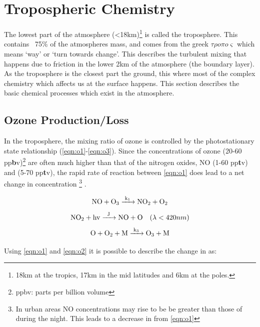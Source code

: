 \citep{failparis}



\section{Tropospheric Chemistry}

The lowest part of the atmosphere (<18km)\footnote{18km at the tropics, 17km in the mid latitudes and 6km at the poles. } is called the troposphere. This contains ~75\% of the atmospheres mass, and comes from the greek $\tau\rho o \pi o \varsigma$ which means `way' or `turn towards change'. This describes the turbulent mixing that happens due to friction in the lower 2km of the atmosphere (the boundary layer). As the troposphere is the closest part the ground, this where most of the complex chemistry which affects us at the surface happens. This section describes the basic chemical processes which exist in the atmosphere.




\subsection{Ozone Production/Loss}\label{sec:o3prod}
In the troposphere, the mixing ratio of ozone is controlled by the photostationary state relationship (\autoref{eqn:o1}-\ref{eqn:o3}).
Since the concentrations of ozone (20-60 pp\textbf{b}v)\footnote{ppbv: parts per billion volume} are often much higher than that of the nitrogen oxides, NO (1-60 pp\textbf{t}v) and  (5-70 pp\textbf{t}v), the rapid rate of reaction between \autoref{eqn:o1} does lead to a net change in  concentration \footnote{In urban areas NO concentrations may rise to be be greater than those of  during the night. This leads to a decrease in from \autoref{eqn:o1}} \citep{fundamentals}.



\begin{equation}
  \centering
\ce{NO + O3 ->[k1] NO2 +O2} \label{eqn:o1}
\end{equation}
\begin{equation}
  \centering
 \ce{NO2 + hv ->[J] NO + O }\ \ \ (\lambda < 420nm) \label{eqn:o2}
\end{equation}
 \begin{equation}
   \centering
\ce{O + O2 + M ->[k3] O3 + M}\label{eqn:o3}
\end{equation}

Using \autoref{eqn:o1} and \autoref{eqn:o2} it is possible to describe the change in  as:


